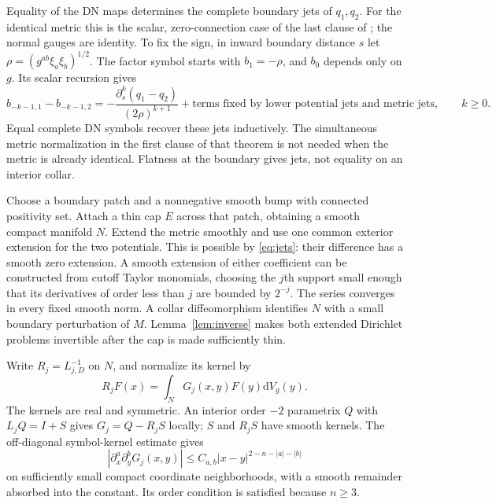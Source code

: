 \documentclass[11pt]{article}
\theoremstyle{definition}\newtheorem{definition}[theorem]{Definition}
\theoremstyle{remark}\newtheorem{remark}[theorem]{Remark}
\newcommand{\dd}{\mathrm d}
\newcommand{\vol}{\dd V}
\begin{document}
Equality of the DN maps determines the complete boundary jets of $q_1,q_2$.
For the identical metric this is the scalar, zero-connection case of the
last clause of \cite[Theorem 3.4]{Cekic}; the normal gauges are identity.
To fix the sign, in inward boundary distance $s$ let
$\rho=(g^{ab}\xi_a\xi_b)^{1/2}$. The factor symbol starts with $b_1=-\rho$,
and $b_0$ depends only on $g$. Its scalar recursion gives
\begin{equation}\label{eq:jets}
 b_{-k-1,1}-b_{-k-1,2}
 =-\frac{\partial_s^k(q_1-q_2)}{(2\rho)^{k+1}}
   +\text{terms fixed by lower potential jets and metric jets},\qquad k\ge0.
\end{equation}
Equal complete DN symbols recover these jets inductively. The simultaneous
metric normalization in the first clause of that theorem is not needed
when the metric is already identical. Flatness at the boundary gives jets,
not equality on an interior collar.

Choose a boundary patch and a nonnegative smooth bump with connected
positivity set. Attach a thin cap $E$ across that patch, obtaining a smooth
compact manifold $N$. Extend the metric smoothly and use one common exterior
extension for the two potentials. This is possible by \eqref{eq:jets}:
their difference has a smooth zero extension. A smooth extension of either
coefficient can be constructed from cutoff Taylor monomials, choosing the
$j$th support small enough that its derivatives of order less than $j$
are bounded by $2^{-j}$. The series converges in every fixed smooth norm.
A collar diffeomorphism identifies $N$ with a small boundary perturbation
of $M$. Lemma~\ref{lem:inverse} makes both extended Dirichlet problems
invertible after the cap is made sufficiently thin.

Write $R_j=L_{j,D}^{-1}$ on $N$, and normalize its kernel by
\[
 R_jF(x)=\int_N G_j(x,y)F(y)\vol_g(y).
\]
The kernels are real and symmetric. An interior order $-2$ parametrix $Q$
with $L_jQ=I+S$ gives $G_j=Q-R_jS$ locally; $S$ and $R_jS$ have smooth
kernels. The off-diagonal symbol-kernel estimate
\cite[Lecture I, (1.21)--(1.24)]{Taylor} gives
\begin{equation}\label{eq:kernelbound}
 |\partial_x^a\partial_y^bG_j(x,y)|
 \le C_{a,b}|x-y|^{2-n-|a|-|b|}
\end{equation}
on sufficiently small compact coordinate neighborhoods, with a smooth
remainder absorbed into the constant. Its order condition is satisfied
because $n\ge3$.
\end{document}
